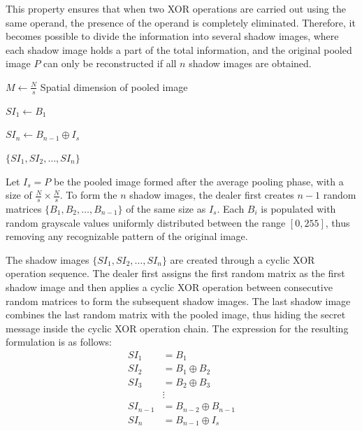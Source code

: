 This property ensures that when two XOR operations are carried out using the same operand, the presence of the operand is completely eliminated. Therefore, it becomes possible to divide the information into several shadow images, where each shadow image holds a part of the total information, and the original pooled image $P$ can only be reconstructed if all $n$ shadow images are obtained.


\begin{algorithm}[H]
\small
\caption{XOR-Based Shadow Generation}
\label{alg:cyclic_xor}
\LinesNumbered
\setcounter{AlgoLine}{0}



$M \gets \frac{N}{s}$\;
Spatial dimension of pooled image\;


$SI_1 \gets B_1$\;


$SI_n \gets B_{n-1} \oplus I_s$\;

\Return $\{SI_1, SI_2, \dots, SI_n\}$\;

\end{algorithm}


Let $I_s = P$ be the pooled image formed after the average pooling phase, with a size of $\frac{N}{s} \times \frac{N}{s}$. To form the $n$ shadow images, the dealer first creates $n-1$ random matrices $\{B_1, B_2, \ldots, B_{n-1}\}$ of the same size as $I_s$. Each $B_i$ is populated with random grayscale values uniformly distributed between the range $[0, 255]$, thus removing any recognizable pattern of the original image.

The shadow images $\{SI_1, SI_2, \ldots, SI_n\}$ are created through a cyclic XOR operation sequence. The dealer first assigns the first random matrix as the first shadow image and then applies a cyclic XOR operation between consecutive random matrices to form the subsequent shadow images. The last shadow image combines the last random matrix with the pooled image, thus hiding the secret message inside the cyclic XOR operation chain. The expression for the resulting formulation is as follows:
\begin{equation}
\begin{aligned}
SI_1 &= B_1 \\
SI_2 &= B_1 \oplus B_2 \\
SI_3 &= B_2 \oplus B_3 \\
&\vdots \\
SI_{n-1} &= B_{n-2} \oplus B_{n-1} \\
SI_n &= B_{n-1} \oplus I_s
\end{aligned}
\end{equation}

